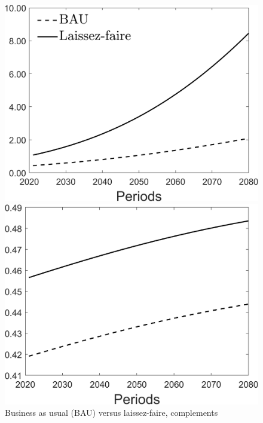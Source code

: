 \begin{figure}[h!!!]
	\centering
	\caption{Business as usual (BAU) versus laissez-faire, complements }\label{fig:onlyBAU_comp}
	\begin{minipage}[]{0.32\textwidth}
		\includegraphics[width=1\textwidth]{../../codding_model/Own/figures/Rep_agent/staticBAU_LF_separate_c_periods59_eppsilon0.40_zeta1.40_Ad08_Ac04_thetac0.70_thetad0.56_HetGrowth1_tauul0.181_util0_withtarget0_lgd1.png}
	\end{minipage}
	\begin{minipage}[]{0.32\textwidth}
		\includegraphics[width=1\textwidth]{../../codding_model/Own/figures/Rep_agent/staticBAU_LF_separate_hh_periods59_eppsilon0.40_zeta1.40_Ad08_Ac04_thetac0.70_thetad0.56_HetGrowth1_tauul0.181_util0_withtarget0_lgd0.png}

\end{minipage}
\end{figure}
